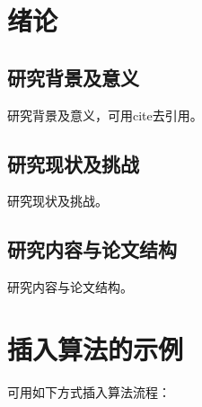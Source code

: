 \documentclass[openany,oneside]{book}
\begin{document}
\frontmatter
\sloppy %




\tableofcontents
{\xiaosi}
\clearpage{\pagestyle{empty}\cleardoublepage}

\mainmatter
{}                        %

\chapter{绪论}
\section{研究背景及意义}

研究背景及意义，可用cite去引用。\cite{dean2008mapreduce}

\lipsum

\section{研究现状及挑战}

研究现状及挑战。

\section{研究内容与论文结构}

研究内容与论文结构。

\chapter{插入算法的示例}

可用如下方式插入算法流程：
\end{document}
